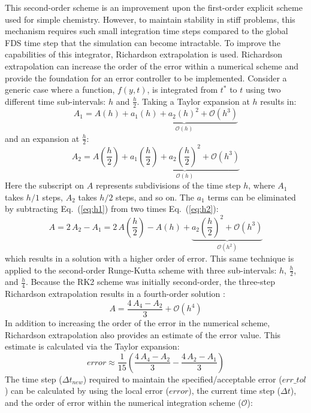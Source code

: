 This second-order scheme is an improvement upon the first-order explicit scheme used for simple chemistry. However, to maintain stability in stiff problems, this mechanism requires such small integration time steps compared to the global FDS time step that the simulation can become intractable. To improve the capabilities of this integrator, Richardson extrapolation is used. Richardson extrapolation can increase the order of the error within a numerical scheme and provide the foundation for an error controller to be implemented. Consider a generic case where a function, $f(y,t)$, is integrated from $t^*$ to $t$ using two different time sub-intervals: $h$ and $\frac{h}{2}$. Taking a Taylor expansion at $h$ results in:
\begin{equation}\label{eq:h1}
A_1={A(h)} + \underbrace{a_{1}(h) + a_{2}(h)^2 + \mathcal{O}(h^3)}_{\mathcal{O}(h)}
\end{equation}
and an expansion at $\frac{h}{2}$:
\begin{equation}\label{eq:h2}
A_2=A(\frac{h}{2}) + \underbrace{a_{1}(\frac{h}{2}) + a_{2}(\frac{h}{2})^2 + \mathcal{O}(h^3)}_{\mathcal{O}(h)}
\end{equation}
Here the subscript on $A$ represents subdivisions of the time step $h$, where $A_1$ takes $h/1$ steps, $A_2$ takes $h/2$ steps, and so on. The $a_{1}$ terms can be eliminated by subtracting Eq.~(\ref{eq:h1}) from two times Eq.~(\ref{eq:h2}):
\begin{equation}\label{eq:A2}
A=2\,A_2-A_1 = 2\,A(\frac{h}{2}) - A(h) + \underbrace{a_{2}(\frac{h}{2})^2 + \mathcal{O}(h^3)}_{\mathcal{O}(h^2)}
\end{equation}
which results in a solution with a higher order of error. This same technique is applied to the second-order Runge-Kutta scheme with three sub-intervals: $h$, $\frac{h}{2}$, and $\frac{h}{4}$. Because the RK2 scheme was initially second-order, the three-step Richardson extrapolation results in a fourth-order solution \cite{Moin:2001}:
\begin{equation}\label{eq:A4}
A=\frac{4\,A_4-A_2}{3}  + \mathcal{O}(h^4)
\end{equation}
In addition to increasing the order of the error in the numerical scheme, Richardson extrapolation also provides an estimate of the error value. This estimate is calculated via the Taylor expansion:
\begin{equation}\label{eq:error}
error \approx \frac{1}{15}(\frac{4\,A_4-A_2}{3} - \frac{4\,A_2-A_1}{3})
\end{equation}
The time step ($\Delta t_{new}$) required to maintain the specified/acceptable error ($err\_tol$) can be calculated by using the local error ($error$), the current time step ($\Delta t$), and the order of error within the numerical integration scheme ($\mathcal{O}$):
